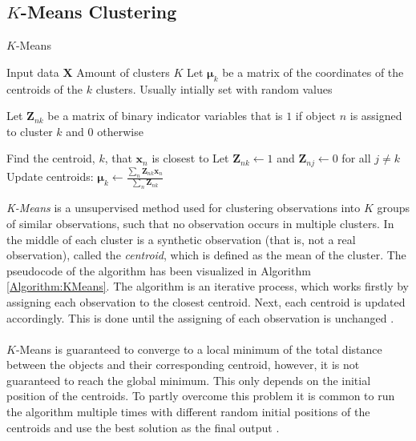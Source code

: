\documentclass[./main.tex]{subfiles}
\begin{document}
\subsection{$K$-Means Clustering}
\begin{algorithm}[t]
    \caption{$K$-Means \cite{MAD_book}}
    \begin{algorithmic}[1]
        \Require Input data $\bm{X}$
        \Require Amount of clusters $K$
        \State Let $\bm{\mu}_k$ be a matrix of the coordinates of the centroids of the $k$ clusters. Usually intially set with random values
        \State \begin{varwidth}[t]{\linewidth}
            Let $\bm{Z}_{nk}$ be a matrix of binary indicator variables that is $1$ if object $n$ is assigned to cluster $k$ and $0$ otherwise
        \end{varwidth}
                \State Find the centroid, $k$, that $\bm{x}_n$ is closest to
                \State Let $\bm{Z}_{nk} \gets 1$ and $\bm{Z}_{nj} \gets 0$ for all $j \neq k$
            \EndFor
            \State Update centroids: $\bm{\mu}_k \gets \frac{\sum_n\bm{Z}_{nk} \bm{x}_n}{\sum_n \bm{Z}_{nk}}$
        \EndWhile
    \end{algorithmic}
    \label{Algorithm:KMeans}
\end{algorithm}

\textit{K-Means} is a unsupervised method used for clustering observations into $K$ groups of similar observations, such that no observation occurs in multiple clusters. In the middle of each cluster is a synthetic observation (that is, not a real observation), called the \textit{centroid}, which is defined as the mean of the cluster. The pseudocode of the algorithm has been visualized in Algorithm \ref{Algorithm:KMeans}. The algorithm is an iterative process, which works firstly by assigning each observation to the closest centroid. Next, each centroid is updated accordingly. This is done until the assigning of each observation is unchanged \cite{MAD_book}.
\\
\\
$K$-Means is guaranteed to converge to a local minimum of the total distance between the objects and their corresponding centroid, however, it is not guaranteed to reach the global minimum. This only depends on the initial position of the centroids. To partly overcome this problem it is common to run the algorithm multiple times with different random initial positions of the centroids and use the best solution as the final output \cite{MAD_book}.
\end{document}
